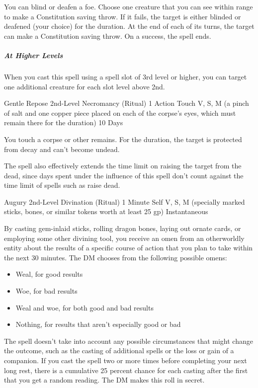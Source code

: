 {You can blind or deafen a foe. Choose one creature that you can see within range to make a Constitution saving throw. If it fails, the target is either blinded or deafened (your choice) for the duration. At the end of each of its turns, the target can make a Constitution saving throw. On a success, the spell ends.

\subparagraph*{At Higher Levels} When you cast this spell using a spell slot of 3rd level or higher, you can target one additional creature for each slot level above 2nd.

\DndSpellHeader
  {Gentle Repose}
  {2nd-Level Necromancy (Ritual)}
  {1 Action}
  {Touch}
  {V, S, M (a pinch of salt and one copper piece placed on each of the corpse’s eyes, which must remain there for the duration)}
  {10 Days}

You touch a corpse or other remains. For the duration, the target is protected from decay and can’t become undead.

The spell also effectively extends the time limit on raising the target from the dead, since days spent under the influence of this spell don’t count against the time limit of spells such as raise dead.

\DndSpellHeader
  {Augury}
  {2nd-Level Divination (Ritual)}
  {1 Minute}
  {Self}
  {V, S, M (specially marked sticks, bones, or similar tokens worth at least 25 gp)}
  {Instantaneous}

By casting gem-inlaid sticks, rolling dragon bones, laying out ornate cards, or employing some other divining tool, you receive an omen from an otherworldly entity about the results of a specific course of action that you plan to take within the next 30 minutes. The DM chooses from the following possible omens:
\begin{itemize}
	\item Weal, for good results
	\item Woe, for bad results
	\item Weal and woe, for both good and bad results
	\item Nothing, for results that aren’t especially good or bad
\end{itemize}
The spell doesn’t take into account any possible circumstances that might change the outcome, such as the casting of additional spells or the loss or gain of a companion. If you cast the spell two or more times before completing your next long rest, there is a cumulative 25 percent chance for each casting after the first that you get a random reading. The DM makes this roll in secret.

}
